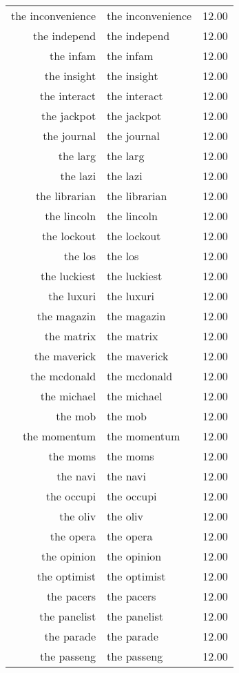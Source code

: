 \begin{table}[ht]
\begin{tabular}{rlr}
  the inconvenience & the inconvenience & 12.00 \\ 
  the independ & the independ & 12.00 \\ 
  the infam & the infam & 12.00 \\ 
  the insight & the insight & 12.00 \\ 
  the interact & the interact & 12.00 \\ 
  the jackpot & the jackpot & 12.00 \\ 
  the journal & the journal & 12.00 \\ 
  the larg & the larg & 12.00 \\ 
  the lazi & the lazi & 12.00 \\ 
  the librarian & the librarian & 12.00 \\ 
  the lincoln & the lincoln & 12.00 \\ 
  the lockout & the lockout & 12.00 \\ 
  the los & the los & 12.00 \\ 
  the luckiest & the luckiest & 12.00 \\ 
  the luxuri & the luxuri & 12.00 \\ 
  the magazin & the magazin & 12.00 \\ 
  the matrix & the matrix & 12.00 \\ 
  the maverick & the maverick & 12.00 \\ 
  the mcdonald & the mcdonald & 12.00 \\ 
  the michael & the michael & 12.00 \\ 
  the mob & the mob & 12.00 \\ 
  the momentum & the momentum & 12.00 \\ 
  the moms & the moms & 12.00 \\ 
  the navi & the navi & 12.00 \\ 
  the occupi & the occupi & 12.00 \\ 
  the oliv & the oliv & 12.00 \\ 
  the opera & the opera & 12.00 \\ 
  the opinion & the opinion & 12.00 \\ 
  the optimist & the optimist & 12.00 \\ 
  the pacers & the pacers & 12.00 \\ 
  the panelist & the panelist & 12.00 \\ 
  the parade & the parade & 12.00 \\ 
  the passeng & the passeng & 12.00 \\ 

\end{tabular}
\end{table}
